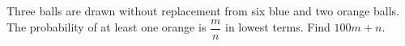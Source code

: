 Three balls are drawn without replacement from six blue and two orange balls. The probability of at least one orange is $\dfrac{m}{n}$ in lowest terms. Find $100m+n$.
